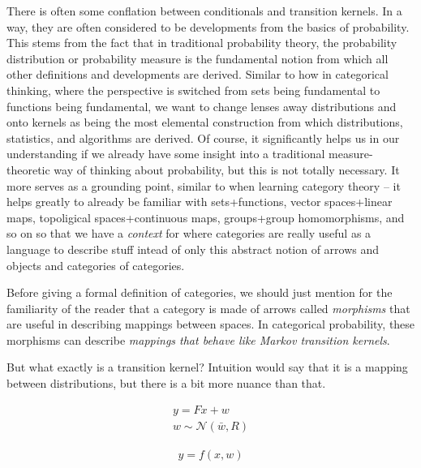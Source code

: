 There is often some conflation between conditionals and transition kernels.
In a way, they are often considered to be developments from the basics of probability.
This stems from the fact that in traditional probability theory, the probability distribution or probability measure is the fundamental notion from which all other definitions and developments are derived.
Similar to how in categorical thinking, where the perspective is switched from sets being fundamental to functions being fundamental, we want to change lenses away distributions and onto kernels as being the most elemental construction from which distributions, statistics, and algorithms are derived. 
Of course, it significantly helps us in our understanding if we already have some insight into a traditional measure-theoretic way of thinking about probability, but this is not totally necessary.
It more serves as a grounding point, similar to when learning category theory -- it helps greatly to already be familiar with sets+functions, vector spaces+linear maps, topoligical spaces+continuous maps, groups+group homomorphisms, and so on so that we have a \emph{context} for where categories are really useful as a language to describe stuff intead of only this abstract notion of arrows and objects and categories of categories.

Before giving a formal definition of categories, we should just mention for the familiarity of the reader that a category is made of arrows called \emph{morphisms} that are useful in describing mappings between spaces. In categorical probability, these morphisms can describe \emph{mappings that behave like Markov transition kernels}.

But what exactly is a transition kernel?
Intuition would say that it is a mapping between distributions, but there is a bit more nuance than that.

\newcommand{\normal}{\mathcal{N}}
\newcommand{\reals}{\mathds{R}}
\begin{equation}
\label{traditional-gaussian-model}
\begin{gathered}
    y = Fx + w \\
    w \sim \normal(\bar{w}, R)
\end{gathered}
\end{equation}

\begin{equation}
    \begin{aligned}
	y = f(x,w)
    \end{aligned}
\end{equation}

